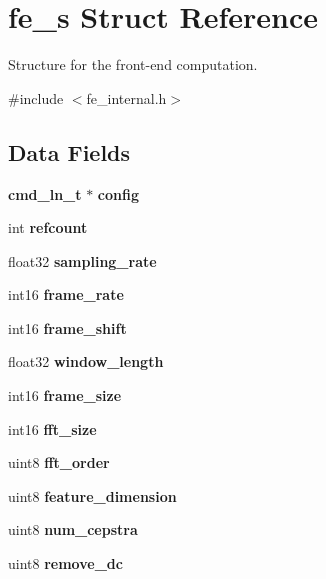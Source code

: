 \section{fe\+\_\+s Struct Reference}
\label{structfe__s}


Structure for the front-\/end computation.  




{\ttfamily \#include $<$fe\+\_\+internal.\+h$>$}

\subsection*{Data Fields}
\begin{DoxyCompactItemize}
\item 
\mbox{\label{structfe__s_abe27cd07861a2f0042f5a83f3371d0fb}} 
\textbf{ cmd\+\_\+ln\+\_\+t} $\ast$ {\bfseries config}
\item 
\mbox{\label{structfe__s_a4cdf2f8b372cfddb38a48dd770450af9}} 
int {\bfseries refcount}
\item 
\mbox{\label{structfe__s_af79879861c60083c1c0135c380bfe8e2}} 
float32 {\bfseries sampling\+\_\+rate}
\item 
\mbox{\label{structfe__s_a23ca679cec8c0643dd1fa32b4e925f00}} 
int16 {\bfseries frame\+\_\+rate}
\item 
\mbox{\label{structfe__s_a62b189505f084007c3799faf3836b118}} 
int16 {\bfseries frame\+\_\+shift}
\item 
\mbox{\label{structfe__s_ae652f41503dd7b853bff8de89340703d}} 
float32 {\bfseries window\+\_\+length}
\item 
\mbox{\label{structfe__s_a72b5838a48f3a10c8ba3917d245093d0}} 
int16 {\bfseries frame\+\_\+size}
\item 
\mbox{\label{structfe__s_a466b997c1f544043fb3ab6f2f89e97e7}} 
int16 {\bfseries fft\+\_\+size}
\item 
\mbox{\label{structfe__s_a3783552280c06207510cbe576a76d1d9}} 
uint8 {\bfseries fft\+\_\+order}
\item 
\mbox{\label{structfe__s_a9c876fb2d9be5f3acaad06ddebcdc4fe}} 
uint8 {\bfseries feature\+\_\+dimension}
\item 
\mbox{\label{structfe__s_a05579b3906420cddd62fdf1ded7b63ce}} 
uint8 {\bfseries num\+\_\+cepstra}
\item 
\mbox{\label{structfe__s_ac575bed8a61105f4302bd27246d4c33d}} 
uint8 {\bfseries remove\+\_\+dc}
\item 
\mbox{\label{structfe__s_a7d3d6513ae6b60632d14c1e1d5dfe891}} 

\end{DoxyCompactItemize}
